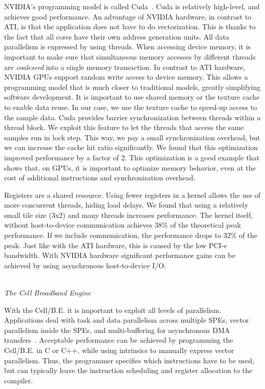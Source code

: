 \documentclass{article}
\newcommand{\longversion}[1]{}
\begin{document}
\noindent NVIDIA's programming model is called Cuda~\cite{cuda-manual}.
Cuda is relatively high-level, and achieves good performance.
An advantage of NVIDIA hardware, in contrast to ATI, is that the application does not have to do 
vectorization. This is thanks to the fact that all cores have their own address generation units. 
All data parallelism is expressed by using threads.
When accessing device memory, it is important to make sure that
simultaneous memory accesses by different threads are \emph{coalesced}
into a single memory transaction.  In contrast to ATI hardware, NVIDIA
GPUs support random write access to device memory. This allows a
programming model that is much closer to traditional models, greatly
simplifying software development.
It is important to use shared memory or the texture cache to enable data reuse.
In our case, we use the texture cache to speed-up access to the sample data. 
Cuda provides barrier synchronization between threads within a thread block.
We exploit this feature to let
the threads that access the same samples run in lock step.  This way,
we pay a small synchronization overhead, but we can increase the cache hit
ratio significantly.  We found that this optimization improved performance by a factor of 2.
This optimization is a good example that shows that, on GPUs, it is important to optimize
memory behavior, even at the cost of additional instructions and synchronization overhead.

\longversion{
We also investigated the use of the per-multiprocessor shared memory as an
application-managed cache.  Others report good results with this
approach~\cite{gpu-cache}.  However, we found that, for our
application, the use of shared memory only led to performance
degradation.
}

Registers are a shared resource. Using fewer registers in a kernel
allows the use of more concurrent threads, hiding load delays.
We found that using a relatively small tile size (3x2) and many threads increases performance.
The kernel itself, without host-to-device communication achieves 38\%
of the theoretical peak performance.  If we include communication, the
performance drops to 32\% of the peak. Just like with the ATI
hardware, this is caused by the low PCI-e bandwidth.  With NVIDIA
hardware significant performance gains can be achieved by using asynchronous host-to-device I/O.


\noindent \\ \emph{The Cell Broadband Engine}

\noindent With the
\mbox{Cell/B.E.} it is important to exploit all levels of parallelism.
Applications deal with task and data parallelism across multiple SPEs,
vector parallelism inside the SPEs, and multi-buffering for
asynchronous DMA transfers~\cite{cell}.  Acceptable performance can be achieved by
programming the \mbox{Cell/B.E.}  in C or C++, while using intrinsics
to manually express vector parallelism.  Thus, the programmer
specifies which instructions have to be used, but can typically leave
the instruction scheduling and register allocation to the compiler.
\end{document}
